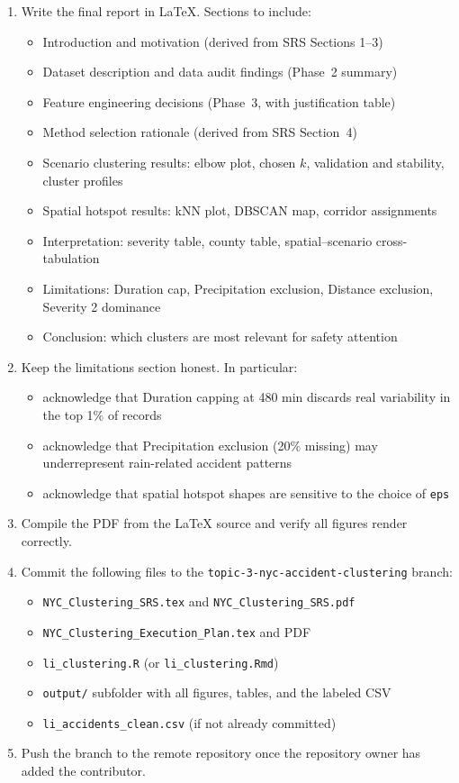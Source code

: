 \documentclass[11pt]{article}
\begin{document}
\begin{enumerate}
  \item Write the final report in LaTeX. Sections to include:
  \begin{itemize}
    \item Introduction and motivation (derived from SRS Sections 1--3)
    \item Dataset description and data audit findings (Phase~2 summary)
    \item Feature engineering decisions (Phase~3, with justification table)
    \item Method selection rationale (derived from SRS Section~4)
    \item Scenario clustering results: elbow plot, chosen $k$, validation and stability, cluster profiles
    \item Spatial hotspot results: kNN plot, DBSCAN map, corridor assignments
    \item Interpretation: severity table, county table, spatial--scenario cross-tabulation
    \item Limitations: Duration cap, Precipitation exclusion, Distance exclusion, Severity 2 dominance
    \item Conclusion: which clusters are most relevant for safety attention
  \end{itemize}

  \item Keep the limitations section honest. In particular:
  \begin{itemize}
    \item acknowledge that Duration capping at 480 min discards real variability in the top 1\% of records
    \item acknowledge that Precipitation exclusion (20\% missing) may underrepresent rain-related accident patterns
    \item acknowledge that spatial hotspot shapes are sensitive to the choice of \texttt{eps}
  \end{itemize}

  \item Compile the PDF from the LaTeX source and verify all figures render correctly.

  \item Commit the following files to the \texttt{topic-3-nyc-accident-clustering} branch:
  \begin{itemize}
    \item \texttt{NYC\_Clustering\_SRS.tex} and \texttt{NYC\_Clustering\_SRS.pdf}
    \item \texttt{NYC\_Clustering\_Execution\_Plan.tex} and PDF
    \item \texttt{li\_clustering.R} (or \texttt{li\_clustering.Rmd})
    \item \texttt{output/} subfolder with all figures, tables, and the labeled CSV
    \item \texttt{li\_accidents\_clean.csv} (if not already committed)
  \end{itemize}

  \item Push the branch to the remote repository once the repository owner has added the contributor.
\end{enumerate}
\end{document}
